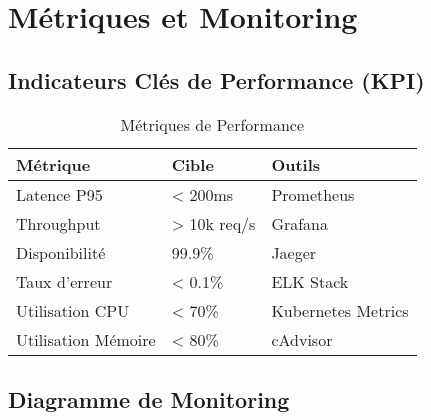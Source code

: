\documentclass[12pt,a4paper]{article}
\begin{document}
\section{Métriques et Monitoring}

\subsection{Indicateurs Clés de Performance (KPI)}

\begin{table}[H]
\centering
\begin{tabular}{|l|l|l|}
\hline
\textbf{Métrique} & \textbf{Cible} & \textbf{Outils} \\
\hline
Latence P95 & < 200ms & Prometheus \\
Throughput & > 10k req/s & Grafana \\
Disponibilité & 99.9\% & Jaeger \\
Taux d'erreur & < 0.1\% & ELK Stack \\
Utilisation CPU & < 70\% & Kubernetes Metrics \\
Utilisation Mémoire & < 80\% & cAdvisor \\
\hline
\end{tabular}
\caption{Métriques de Performance}
\label{tab:metrics}
\end{table}

\subsection{Diagramme de Monitoring}
\end{document}
